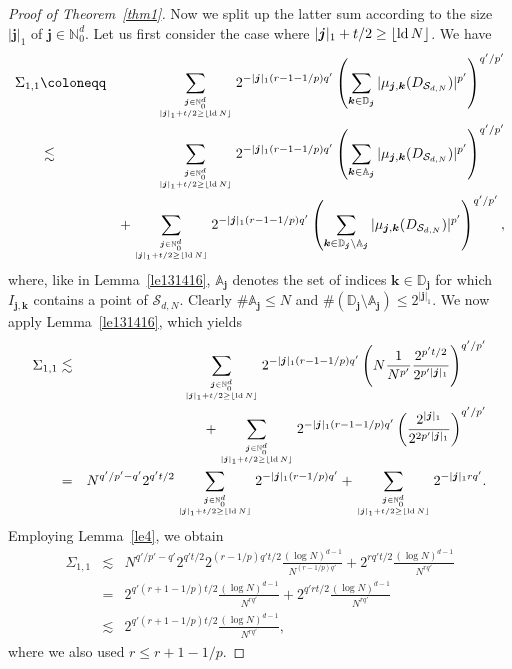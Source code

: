 \documentclass[12pt, a4paper]{article}
\def\S{\mathcal{S}}
\newcommand{\ld}{{\rm ld}\,}
\newcommand{\bsj}{{\boldsymbol{j}}}
\newcommand{\bsk}{{\boldsymbol{k}}}
\newcommand{\bbN}{{\mathbb{N}}}
\newcommand{\bbD}{{\mathbb{D}}}
\newcommand{\bbA}{{\mathbb{A}}}
\begin{document}
\begin{proof}[Proof of Theorem~\ref{thm1}]
Now we split up the latter sum according to the size $|\bsj|_1$ of $\bsj \in \bbN_0^d$. Let us first consider the case where $|\bsj|_1+t/2\geq \lfloor \ld N \rfloor$. We have
\begin{eqnarray*}
\Sigma_{1,1} & \coloneqq & \sum_{\bsj \in \bbN_{0}^d \atop |\bsj|_1+t/2\geq \lfloor \ld N \rfloor} 2^{-|\bsj|_1 (r-1-1/p) q'} \left(\sum_{\bsk \in \bbD_{\bsj}} |\mu_{\bsj, \bsk}(D_{\S_{d,N}})|^{p'}\right)^{q'/p'} \\    
& \lesssim & \sum_{\bsj \in \bbN_{0}^d \atop |\bsj|_1+t/2\geq \lfloor \ld N \rfloor} 2^{-|\bsj|_1 (r-1-1/p) q'} \left(\sum_{\bsk \in \bbA_{\bsj}} |\mu_{\bsj, \bsk}(D_{\S_{d,N}})|^{p'}\right)^{q'/p'}\\
& & + \sum_{\bsj \in \bbN_{0}^d \atop |\bsj|_1+t/2\geq \lfloor \ld N \rfloor} 2^{-|\bsj|_1 (r-1-1/p) q'} \left(\sum_{\bsk \in \bbD_{\bsj}\setminus \bbA_{\bsj}} |\mu_{\bsj, \bsk}(D_{\S_{d,N}})|^{p'}\right)^{q'/p'},
\end{eqnarray*}
where, like in Lemma~\ref{le131416}, $\bbA_{\bsj}$ denotes the set of indices $\bsk \in \bbD_{\bsj}$ for which $I_{\bsj,\bsk}$ contains a point of $\S_{d,N}$. Clearly $\# \bbA_{\bsj} \le N$ and $\#(\bbD_\bsj \setminus \bbA_\bsj) \leq 2^{|\bsj|_1}$. We now apply Lemma~\ref{le131416}, which yields
\begin{eqnarray*}
\Sigma_{1,1} & \lesssim & \sum_{\bsj \in \bbN_{0}^d \atop |\bsj|_1+t/2\geq \lfloor \ld N \rfloor} 2^{-|\bsj|_1 (r-1-1/p) q'} \left(N \frac{1}{N^{p'}} \frac{2^{p' t/2}}{2^{p'|\bsj|_1}}\right)^{q'/p'}\\
& & + \sum_{\bsj \in \bbN_{0}^d \atop |\bsj|_1+t/2\geq \lfloor \ld N \rfloor} 2^{-|\bsj|_1 (r-1-1/p) q'} \left( \frac{2^{|\bsj|_1}}{2^{2 p' |\bsj|_1}}  \right)^{q'/p'}\\
& = &  N^{q'/p'-q'} 2^{q' t/2} \sum_{\bsj \in \bbN_{0}^d \atop |\bsj|_1+t/2\geq \lfloor \ld N \rfloor} 2^{-|\bsj|_1 (r-1/p) q'} + \sum_{\bsj \in \bbN_{0}^d \atop |\bsj|_1+t/2\geq \lfloor \ld N \rfloor} 2^{-|\bsj|_1 r q'}. 
\end{eqnarray*}
Employing Lemma~\ref{le4}, we obtain 
\begin{eqnarray*}
\Sigma_{1,1} 
& \lesssim &  N^{q'/p'-q'} 2^{q' t/2} 2^{(r-1/p) q' t/2} \frac{(\log N)^{d-1}}{N^{(r-1/p) q'}} + 2^{r q' t/2} \frac{(\log N)^{d-1}}{N^{r q'}}\\  
& = & 2^{q'(r+1-1/p) t/2}  \frac{(\log N)^{d-1}}{N^{r q'}} + 2^{q' r t/2} \frac{(\log N)^{d-1}}{N^{r q'}}\\
& \lesssim & 2^{q' (r+1-1/p) t/2} \frac{(\log N)^{d-1}}{N^{r q'}},
\end{eqnarray*}
where we also used $r \leq r+1-1/p$.


\end{proof}
\end{document}

